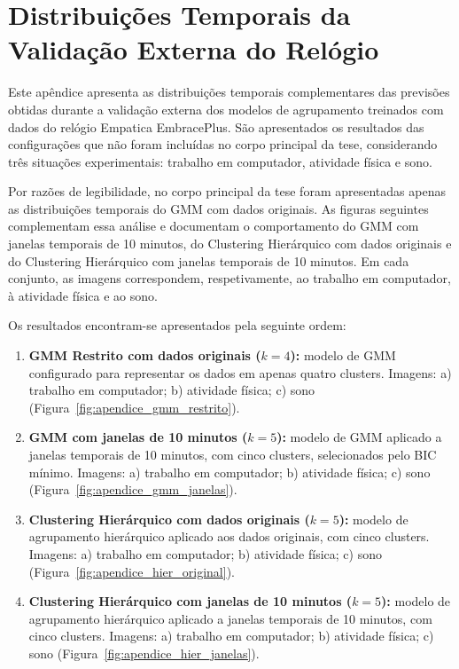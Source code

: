 
\chapter{Distribuições Temporais da Validação Externa do Relógio}
\label{AppendixB}

Este apêndice apresenta as distribuições temporais complementares das previsões obtidas durante a validação externa dos modelos de agrupamento treinados com dados do relógio Empatica EmbracePlus. São apresentados os resultados das configurações que não foram incluídas no corpo principal da tese, considerando três situações experimentais: trabalho em computador, atividade física e sono.

Por razões de legibilidade, no corpo principal da tese foram apresentadas apenas as distribuições temporais do GMM com dados originais. As figuras seguintes complementam essa análise e documentam o comportamento do GMM com janelas temporais de 10 minutos, do Clustering Hierárquico com dados originais e do Clustering Hierárquico com janelas temporais de 10 minutos. Em cada conjunto, as imagens correspondem, respetivamente, ao trabalho em computador, à atividade física e ao sono.

Os resultados encontram-se apresentados pela seguinte ordem:
\begin{enumerate}
    \item \textbf{GMM Restrito com dados originais ($k=4$):} modelo de GMM configurado para representar os dados em apenas quatro clusters. Imagens: a) trabalho em computador; b) atividade física; c) sono (Figura~\ref{fig:apendice_gmm_restrito}).
    \item \textbf{GMM com janelas de 10 minutos ($k=5$):} modelo de GMM aplicado a janelas temporais de 10 minutos, com cinco clusters, selecionados pelo BIC mínimo. Imagens: a) trabalho em computador; b) atividade física; c) sono (Figura~\ref{fig:apendice_gmm_janelas}).
    \item \textbf{Clustering Hierárquico com dados originais ($k=5$):} modelo de agrupamento hierárquico aplicado aos dados originais, com cinco clusters. Imagens: a) trabalho em computador; b) atividade física; c) sono (Figura~\ref{fig:apendice_hier_original}).
    \item \textbf{Clustering Hierárquico com janelas de 10 minutos ($k=5$):} modelo de agrupamento hierárquico aplicado a janelas temporais de 10 minutos, com cinco clusters. Imagens: a) trabalho em computador; b) atividade física; c) sono (Figura~\ref{fig:apendice_hier_janelas}).
\end{enumerate}

